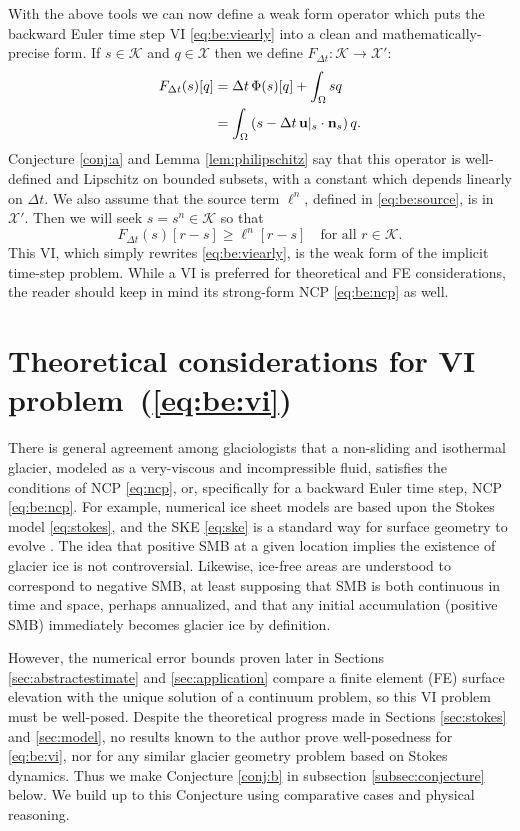 \documentclass[hidelinks,onefignum,onetabnum,final]{siamart220329}  %
\newcommand{\bn}{\mathbf{n}}
\newcommand{\bu}{\mathbf{u}}
\newcommand{\cK}{\mathcal{K}}
\newcommand{\cX}{\mathcal{X}}
\begin{document}
With the above tools we can now define a weak form operator which puts the backward Euler time step VI \eqref{eq:be:viearly} into a clean and mathematically-precise form.  If $s\in\cK$ and $q\in\cX$ then we define $F_{\Delta t}:\cK\to\cX'$:
\begin{align}
F_{\Delta t}(s)[q] &= \Delta t\,\Phi(s)[q] + \int_\Omega s q \label{eq:be:Fdefine}\\
    &= \int_\Omega \left(s - \Delta t\, \bu|_s \cdot \bn_s\right) q. \notag
\end{align}
Conjecture \ref{conj:a} and Lemma \ref{lem:philipschitz} say that this operator is well-defined and Lipschitz on bounded subsets, with a constant which depends linearly on $\Delta t$.  We also assume that the source term $\ell^n$, defined in \eqref{eq:be:source}, is in $\cX'$.  Then we will seek $s = s^n \in \cK$ so that
\begin{equation}
F_{\Delta t}(s)[r-s] \ge \ell^n[r-s] \quad \text{for all } r \in \cK. \label{eq:be:vi}
\end{equation}
This VI, which simply rewrites \eqref{eq:be:viearly}, is the weak form of the implicit time-step problem.  While a VI is preferred for theoretical and FE considerations, the reader should keep in mind its strong-form NCP \eqref{eq:be:ncp} as well.


\section{Theoretical considerations for VI problem~(\ref{eq:be:vi})} \label{sec:theory}

There is general agreement among glaciologists that a non-sliding and isothermal glacier, modeled as a very-viscous and incompressible fluid, satisfies the conditions of NCP \eqref{eq:ncp}, or, specifically for a backward Euler time step, NCP \eqref{eq:be:ncp}.  For example, numerical ice sheet models \cite{IsaacStadlerGhattas2015,Pattynetal2008,WirbelJarosch2020} are based upon the Stokes model \eqref{eq:stokes}, and the SKE \eqref{eq:ske} is a standard way for surface geometry to evolve \cite{GreveBlatter2009,SchoofHewitt2013}.  The idea that positive SMB at a given location implies the existence of glacier ice is not controversial.  Likewise, ice-free areas are understood to correspond to negative SMB, at least supposing that SMB is both continuous in time and space, perhaps annualized, and that any initial accumulation (positive SMB) immediately becomes glacier ice by definition.

However, the numerical error bounds proven later in Sections \ref{sec:abstractestimate} and \ref{sec:application} compare a finite element (FE) surface elevation with the unique solution of a continuum problem, so this VI problem must be well-posed.  Despite the theoretical progress made in Sections \ref{sec:stokes} and \ref{sec:model}, no results known to the author prove well-posedness for \eqref{eq:be:vi}, nor for any similar glacier geometry problem based on Stokes dynamics.  Thus we make Conjecture \ref{conj:b} in subsection \ref{subsec:conjecture} below.  We build up to this Conjecture using comparative cases and physical reasoning.
\end{document}
